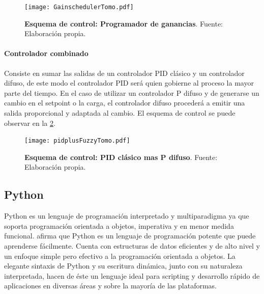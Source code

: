                \begin{figure}[htb]
                    \centering
                    \texttt{[image: GainschedulerTomo.pdf]}
                    \caption[Esquema de control: Programador de ganancias]{\textbf{Esquema de control: Programador de ganancias}. Fuente: Elaboración propia.} 
                    \label{fig:GainschedulerTomo}
                \end{figure}
            
            \paragraph{Controlador combinado}
                
                Consiste en sumar las salidas de un controlador PID clásico y un controlador difuso, de este modo el controlador PID será quien gobierne al proceso la mayor parte del tiempo. En el caso de utilizar un controlador P difuso y de generarse un cambio en el setpoint o la carga, el controlador difuso procederá a emitir una salida proporcional y adaptada al cambio. El esquema de control se puede observar en la \cref{fig:pidplusFuzzyTomo}.
            
                \begin{figure}[htb]
                    \centering
                    \texttt{[image: pidplusFuzzyTomo.pdf]}
                    \caption[Esquema de control: PID clásico mas P difuso]{\textbf{Esquema de control: PID clásico mas P difuso}. Fuente: Elaboración propia.} 
                    \label{fig:pidplusFuzzyTomo}
                \end{figure}

    \subsection{Python}
        
        Python es un lenguaje de programación interpretado y multiparadigma ya que soporta programación orientada a objetos, imperativa y en menor medida funcional. \textcite{guido2017tutorial} afirma que Python es un lenguaje de programación potente que puede aprenderse fácilmente. Cuenta con estructuras de datos eficientes y de alto
        nivel y un enfoque simple pero efectivo a la programación orientada a objetos. La elegante sintaxis de Python y su escritura
        dinámica, junto con su naturaleza interpretada, hacen de éste un lenguaje ideal para scripting y desarrollo rápido de
        aplicaciones en diversas áreas y sobre la mayoría de las plataformas.
        
